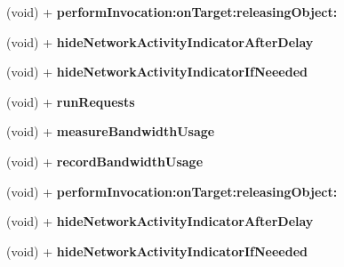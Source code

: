 \begin{DoxyCompactItemize}
\item 
\hypertarget{interface_a_s_i_h_t_t_p_request_07_08_ac5f0757b7a71e70cee7a93dd7e9ee9f8}{
(void) + {\bfseries perform\-Invocation\-:on\-Target\-:releasing\-Object\-:}}
\label{interface_a_s_i_h_t_t_p_request_07_08_ac5f0757b7a71e70cee7a93dd7e9ee9f8}

\item 
\hypertarget{interface_a_s_i_h_t_t_p_request_07_08_a8b784d38e3706dbbce3d956bfe8c4d11}{
(void) + {\bfseries hide\-Network\-Activity\-Indicator\-After\-Delay}}
\label{interface_a_s_i_h_t_t_p_request_07_08_a8b784d38e3706dbbce3d956bfe8c4d11}

\item 
\hypertarget{interface_a_s_i_h_t_t_p_request_07_08_a60cd7d715f73401f380a650c2257d32b}{
(void) + {\bfseries hide\-Network\-Activity\-Indicator\-If\-Neeeded}}
\label{interface_a_s_i_h_t_t_p_request_07_08_a60cd7d715f73401f380a650c2257d32b}

\item 
\hypertarget{interface_a_s_i_h_t_t_p_request_07_08_a3948708d5250dec349a05e2d5d943ba0}{
(void) + {\bfseries run\-Requests}}
\label{interface_a_s_i_h_t_t_p_request_07_08_a3948708d5250dec349a05e2d5d943ba0}

\item 
\hypertarget{interface_a_s_i_h_t_t_p_request_07_08_ae002cae4049589d09b529b25d0a4df61}{
(void) + {\bfseries measure\-Bandwidth\-Usage}}
\label{interface_a_s_i_h_t_t_p_request_07_08_ae002cae4049589d09b529b25d0a4df61}

\item 
\hypertarget{interface_a_s_i_h_t_t_p_request_07_08_a9bfa27b53cfee20fcb4353aaa1fe015b}{
(void) + {\bfseries record\-Bandwidth\-Usage}}
\label{interface_a_s_i_h_t_t_p_request_07_08_a9bfa27b53cfee20fcb4353aaa1fe015b}

\item 
\hypertarget{interface_a_s_i_h_t_t_p_request_07_08_ac5f0757b7a71e70cee7a93dd7e9ee9f8}{
(void) + {\bfseries perform\-Invocation\-:on\-Target\-:releasing\-Object\-:}}
\label{interface_a_s_i_h_t_t_p_request_07_08_ac5f0757b7a71e70cee7a93dd7e9ee9f8}

\item 
\hypertarget{interface_a_s_i_h_t_t_p_request_07_08_a8b784d38e3706dbbce3d956bfe8c4d11}{
(void) + {\bfseries hide\-Network\-Activity\-Indicator\-After\-Delay}}
\label{interface_a_s_i_h_t_t_p_request_07_08_a8b784d38e3706dbbce3d956bfe8c4d11}

\item 
\hypertarget{interface_a_s_i_h_t_t_p_request_07_08_a60cd7d715f73401f380a650c2257d32b}{
(void) + {\bfseries hide\-Network\-Activity\-Indicator\-If\-Neeeded}}
\label{interface_a_s_i_h_t_t_p_request_07_08_a60cd7d715f73401f380a650c2257d32b}


\end{DoxyCompactItemize}
